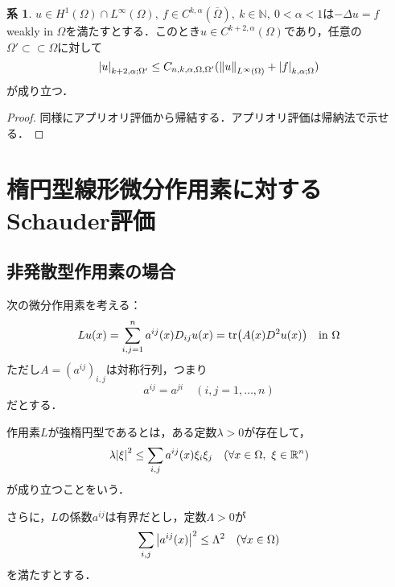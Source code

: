 \documentclass[a4paper]{ltjsarticle}
\newcommand{\Rset}{\mathbb{R}}
\newcommand{\Nset}{\mathbb{N}}
\newcommand{\Om}{\Omega}
\newcommand{\Ombar}{\overline{\Omega}}
\newcommand{\ssubset}{\subset\subset}
\newcommand{\inn}{\quad\text{in}\ }
\newcommand{\1}{\mathbbm{1}}
\numberwithin{equation}{section}
\theoremstyle{definition}
\newtheorem{cor}[thm]{系}
\begin{document}
\begin{cor}
    $u\in H^1(\Om)\cap L^\infty(\Om),\ f\in C^{k,\alpha}(\Ombar),\ k\in\Nset,\ 0<\alpha<1$は$-\Delta u=f$ weakly in $\Om$を満たすとする．このとき$u\in C^{k+2,\alpha}(\Om)$であり，任意の$\Om'\ssubset \Om$に対して
    \begin{equation}
        \abs{u}_{k+2,\alpha;\Om'}\leq C_{n,k,\alpha,\Om,\Om'}(\norm{u}_{L^\infty(\Om)}+\abs{f}_{k,\alpha;\Om}) 
    \end{equation}
    が成り立つ．
\end{cor}
\begin{proof}
    同様にアプリオリ評価から帰結する．アプリオリ評価は帰納法で示せる．
\end{proof}
\section{楕円型線形微分作用素に対するSchauder評価}
\subsection{非発散型作用素の場合}
次の微分作用素を考える：
\begin{equation}
    Lu(x)=\sum_{i,j=1}^n a^{ij}(x)D_{ij}u(x)=\tr(A(x)D^2u(x))\inn \Om \label{eq:non_divergence_form}
\end{equation}
ただし$A=(a^{ij})_{i,j}$は対称行列，つまり
\begin{equation}
    a^{ij}=a^{ji}\quad (i,j=1,\ldots,n) \label{eq:symmetric_coefficients}
\end{equation}
だとする．

作用素$L$が強楕円型であるとは，ある定数$\lambda>0$が存在して，
\begin{equation}
    \lambda\abs{\xi}^2\leq \sum_{i,j}a^{ij}(x)\xi_i\xi_j\quad (\forall x\in\Om,\ \xi\in\Rset^n)\label{eq:strong_ellipticity}
\end{equation}
が成り立つことをいう．

さらに，$L$の係数$a^{ij}$は有界だとし，定数$\Lambda>0$が
\begin{equation}
    \sum_{i,j}\abs{a^{ij}(x)}^2\leq \Lambda^2 \quad (\forall x\in\Omega) \label{eq:bdd_coefficients} 
\end{equation}
を満たすとする．
\end{document}
